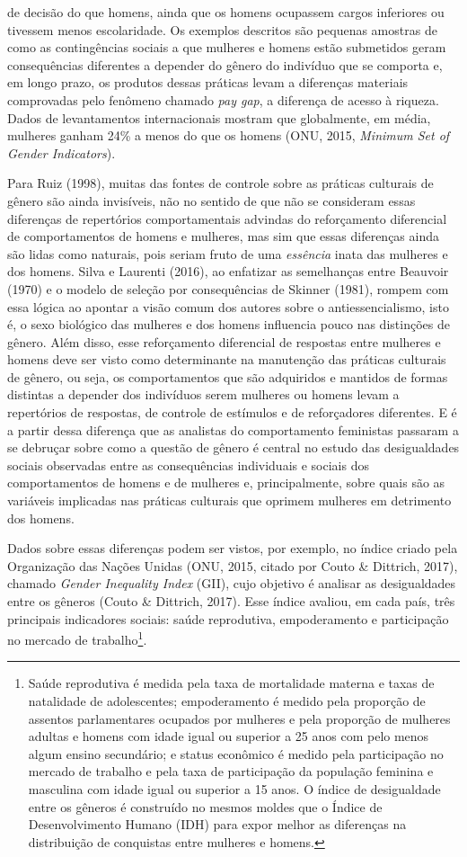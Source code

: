 de decisão do que homens, ainda que os homens ocupassem cargos inferiores ou tivessem menos escolaridade. Os exemplos descritos são pequenas amostras de como as contingências sociais a que mulheres e homens estão submetidos geram consequências diferentes a depender do gênero do indivíduo que se comporta e, em longo prazo, os produtos dessas práticas levam a diferenças materiais comprovadas pelo fenômeno chamado \textit{pay gap}, a diferença de acesso à riqueza. Dados de levantamentos internacionais mostram que globalmente, em média, mulheres ganham 24\% a menos do que os homens (ONU, 2015, \textit{Minimum Set of Gender Indicators}).

Para Ruiz (1998), muitas das fontes de controle sobre as práticas culturais de gênero são ainda invisíveis, não no sentido de que não se consideram essas diferenças de repertórios comportamentais advindas do reforçamento diferencial de comportamentos de homens e mulheres, mas sim que essas diferenças ainda são lidas como naturais, pois seriam fruto de uma \textit{essência} inata das mulheres e dos homens. Silva e Laurenti (2016), ao enfatizar as semelhanças entre Beauvoir (1970) e o modelo de seleção por consequências de Skinner (1981), rompem com essa lógica ao apontar a visão comum dos autores sobre o antiessencialismo, isto é, o sexo biológico das mulheres e dos homens influencia pouco nas distinções de gênero. Além disso, esse reforçamento diferencial de respostas entre mulheres e homens deve ser visto como determinante na manutenção das práticas culturais de gênero, ou seja, os comportamentos que são adquiridos e mantidos de formas distintas a depender dos indivíduos serem mulheres ou homens levam a repertórios de respostas, de controle de estímulos e de reforçadores diferentes. E é a partir dessa diferença que as analistas do comportamento feministas passaram a se debruçar sobre como a questão de gênero é central no estudo das desigualdades sociais observadas entre as consequências individuais e sociais dos comportamentos de homens e de mulheres e, principalmente, sobre quais são as variáveis implicadas nas práticas culturais que oprimem mulheres em detrimento dos homens.

Dados sobre essas diferenças podem ser vistos, por exemplo, no índice criado pela Organização das Nações Unidas (ONU, 2015, citado por Couto \& Dittrich, 2017), chamado \textit{Gender Inequality Index} (GII), cujo objetivo é analisar as desigualdades entre os gêneros (Couto \& Dittrich, 2017). Esse índice avaliou, em cada país, três principais indicadores sociais: saúde reprodutiva, empoderamento e participação no mercado de trabalho\footnote{Saúde reprodutiva é medida pela taxa de mortalidade materna e taxas de natalidade de adolescentes; empoderamento é medido pela proporção de assentos parlamentares ocupados por mulheres e pela proporção de mulheres adultas e homens com idade igual ou superior a 25 anos com pelo menos algum ensino secundário; e status econômico é medido pela participação no mercado de trabalho e pela taxa de participação da população feminina e masculina com idade igual ou superior a 15 anos. O índice de desigualdade entre os gêneros é construído no mesmos moldes que o Índice de Desenvolvimento Humano (IDH) para expor melhor as diferenças na distribuição de conquistas entre mulheres e homens.}.

